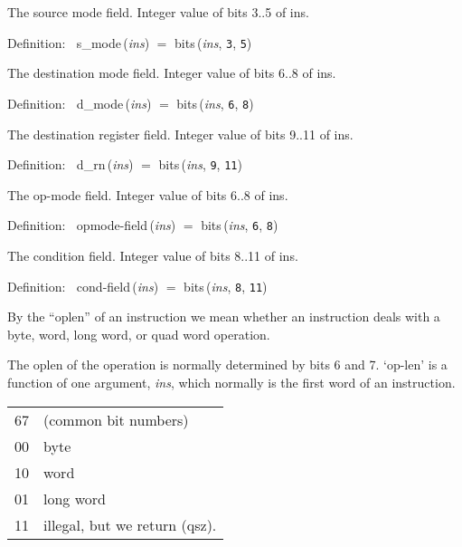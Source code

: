  The source mode field.  Integer value of bits 3..5 of ins.
\begin{tabbing}{\sc Definition}:$\;\;$
{\rm{s\_mode}}\,({\it{ins\/}}) $=$ {\rm{bits}}\,({\it{ins\/}}, {\tt{3}}, {\tt{5}})
\end{tabbing}

 The destination mode field.  Integer value of bits 6..8 of ins.
\begin{tabbing}{\sc Definition}:$\;\;$
{\rm{d\_mode}}\,({\it{ins\/}}) $=$ {\rm{bits}}\,({\it{ins\/}}, {\tt{6}}, {\tt{8}})
\end{tabbing}

 The destination register field.  Integer value of bits 9..11 of ins.
\begin{tabbing}{\sc Definition}:$\;\;$
{\rm{d\_rn}}\,({\it{ins\/}}) $=$ {\rm{bits}}\,({\it{ins\/}}, {\tt{9}}, {\tt{11}})
\end{tabbing}

 The op-mode field.  Integer value of bits 6..8 of ins.
\begin{tabbing}{\sc Definition}:$\;\;$
{\rm{opmode-field}}\,({\it{ins\/}}) $=$ {\rm{bits}}\,({\it{ins\/}}, {\tt{6}}, {\tt{8}})
\end{tabbing}

 The condition field.  Integer value of bits 8..11 of ins.
\begin{tabbing}{\sc Definition}:$\;\;$
{\rm{cond-field}}\,({\it{ins\/}}) $=$ {\rm{bits}}\,({\it{ins\/}}, {\tt{8}}, {\tt{11}})
\end{tabbing}

 By the ``oplen'' of an instruction we mean whether an instruction
 deals with a byte, word, long word, or quad word operation.

 The oplen of the operation is normally determined by bits 6 and 7.
 `op-len' is a function of one argument, {\it{ins\/}}, which normally is the
 first word of an instruction.

 \begin{tabular}{ll}
  67 & (common bit numbers)  \\
  00 & byte \\
  10 & word \\
  01 & long word \\
  11 & illegal, but we return (qsz).
 \end{tabular}
 
